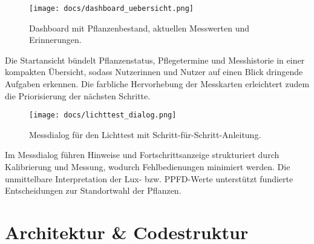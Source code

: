 \documentclass[14pt,a4paper]{report}
\begin{document}
\begin{figure}[hbtp]
    \centering
    \texttt{[image: docs/dashboard\_uebersicht.png]}
    \caption{Dashboard mit Pflanzenbestand, aktuellen Messwerten und Erinnerungen.}
\end{figure}
Die Startansicht bündelt Pflanzenstatus, Pflegetermine und Messhistorie in einer kompakten Übersicht, sodass Nutzerinnen und Nutzer auf einen Blick dringende Aufgaben erkennen. Die farbliche Hervorhebung der Messkarten erleichtert zudem die Priorisierung der nächsten Schritte.

\begin{figure}[hbtp]
    \centering
    \texttt{[image: docs/lichttest\_dialog.png]}
    \caption{Messdialog für den Lichttest mit Schritt-für-Schritt-Anleitung.}
\end{figure}
Im Messdialog führen Hinweise und Fortschrittsanzeige strukturiert durch Kalibrierung und Messung, wodurch Fehlbedienungen minimiert werden. Die unmittelbare Interpretation der Lux- bzw. PPFD-Werte unterstützt fundierte Entscheidungen zur Standortwahl der Pflanzen.

\chapter{Architektur \& Codestruktur}
\end{document}
